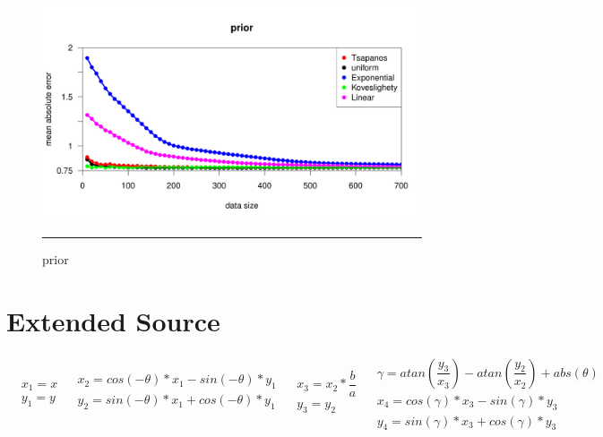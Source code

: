 \begin{figure}[!htpb]
    \centering
		\includegraphics[scale=0.33]{Figures/prior.pdf}
		\rule{35em}{0.5pt}
	\caption[prior]{prior}
	\label{fig:prior}
\end{figure}



\section{Extended Source}


\begin{subequations}
\begin{equation}
\begin{aligned}
&x_1 = x\\ 
& y_1 = y
\end{aligned}
\end{equation}
\begin{equation}
\begin{aligned}
&x_2 = cos(-\theta)*x_1-sin(-\theta)*y_1 \\
&y_2 = sin(-\theta)*x_1+cos(-\theta)*y_1 \\
\end{aligned}
\end{equation}
\begin{equation}
\begin{aligned}
&x_3 = x_2 * \dfrac{b}{a} \\
&y_3 = y_2\\
\end{aligned}
\end{equation}
\begin{equation}
\begin{aligned}
&\gamma = atan(\dfrac{y_3}{x_3} )-atan(\dfrac{y_2}{x_2} )+abs(\theta)\\
&x_4 = cos(\gamma)*x_3-sin(\gamma)*y_3\\
&y_4 = sin(\gamma)*x_3+cos(\gamma)*y_3
\end{aligned}
\end{equation}
\label{eqn:transformR}
\end{subequations}

